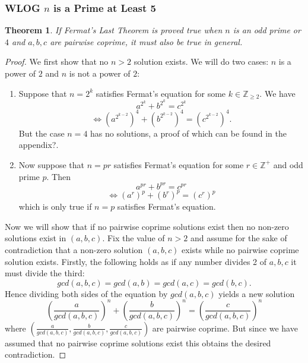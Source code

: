 \documentclass{article}
\newtheorem{theorem}{Theorem}[section]
\theoremstyle{definition}
\theoremstyle{definition}
\theoremstyle{definition}
\newcommand{\Z}{\mathbb{Z}}
\begin{document}
\subsubsection{WLOG $n$ is a Prime at Least 5} %
\begin{theorem}
    If Fermat's Last Theorem is proved true when $n$ is an odd prime or $4$ and $a,b,c$ are pairwise coprime, it must also be true in general.
\end{theorem}
\begin{proof}
    We first show that no $n>2$ solution exists. We will do two cases: $n$ is a power of $2$ and $n$ is not a power of $2$: 
    \newline
   \begin{enumerate}
       \item Suppose that $n=2^k$ satisfies Fermat's equation for some $k\in \Z_{\geq2}$. We have $$a^{2^k}+b^{2^k}=c^{2^k}$$ $$\iff (a^{2^{k-2}})^4+(b^{2^{k-2}})^4=(c^{2^{k-2}})^4.$$ But the case $n=4$ has no solutions, a proof of which can be found in the appendix?.
       \item Now suppose that $n=pr$ satisfies Fermat's equation for some $r\in \Z^+$ and odd prime $p$. Then $$a^{pr}+b^{pr}=c^{pr}$$ $$\iff (a^r)^p+(b^r)^p=(c^r)^p$$ which is only true if $n=p$ satisfies Fermat's equation. 
   \end{enumerate} 

    Now we will show that if no pairwise coprime solutions exist then no non-zero solutions exist in $(a,b,c)$. Fix the value of $n>2$ and assume for the sake of contradiction that a non-zero solution $(a,b,c)$ exists while no pairwise coprime solution exists. Firstly, the following holds as if any number divides 2 of $a,b,c$ it must divide the third: $$gcd(a,b,c)=gcd(a,b)=gcd(a,c)=gcd(b,c).$$ 
    Hence dividing both sides of the equation by $gcd(a,b,c)$ yields a new solution $${(\frac{a}{gcd(a,b,c)})}^n+{(\frac{b}{gcd(a,b,c)})}^n={(\frac{c}{gcd(a,b,c)})}^n$$ where $({\frac{a}{gcd(a,b,c)}},{\frac{b}{gcd(a,b,c)}},{\frac{c}{gcd(a,b,c)}})$ are pairwise coprime. But since we have assumed that no pairwise coprime solutions exist this obtains the desired contradiction. 
    

\end{proof}
\end{document}
